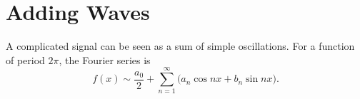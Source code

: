 \section{Adding Waves}\label{sec:waves}
A complicated signal can be seen as a sum of simple oscillations.
For a function of period $2\pi$, the Fourier series is
\begin{equation}\label{eq:series}
  f(x) \sim \frac{a_0}{2} + \sum_{n=1}^{\infty} \bigl(a_n\cos nx + b_n\sin nx\bigr).
\end{equation}
